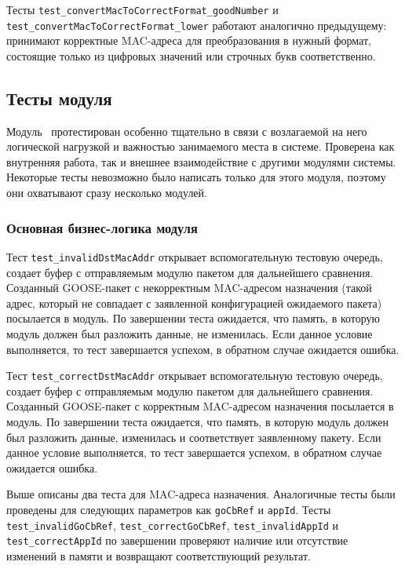 Тесты \lstinline{test_convertMacToCorrectFormat_goodNumber} и \lstinline{test_convertMacToCorrectFormat_lower} работают аналогично предыдущему: принимают корректные MAC-адреса для преобразования в нужный формат, состоящие только из  цифровых значений или  строчных букв соответственно.

\subsection{Тесты модуля \moduleRecvPackets}

Модуль \moduleRecvPackets\ протестирован особенно тщательно в связи с возлагаемой на него логической нагрузкой и важностью занимаемого места в системе. Проверена как внутренняя работа, так и внешнее взаимодействие с другими модулями системы. Некоторые тесты невозможно было написать только для этого модуля, поэтому они охватывают сразу несколько модулей.

\subsubsection{Основная бизнес-логика модуля}

Тест \lstinline{test_invalidDstMacAddr} открывает вспомогательную тестовую очередь, создает буфер с отправляемым модулю пакетом для дальнейшего сравнения.
Созданный GOOSE-пакет с некорректным  MAC-адресом назначения (такой адрес, который не совпадает с заявленной конфигурацией ожидаемого пакета) посылается в модуль. По завершении теста ожидается, что память, в которую модуль должен был разложить данные, не изменилась. Если данное условие выполняется, то тест завершается успехом, в обратном случае ожидается ошибка.

Тест \lstinline{test_correctDstMacAddr} открывает вспомогательную тестовую очередь, создает буфер с отправляемым модулю пакетом для дальнейшего сравнения.
Созданный GOOSE-пакет с корректным  MAC-адресом назначения посылается в модуль. По завершении теста ожидается, что память, в которую модуль должен был разложить данные, изменилась и соответствует заявленному пакету. Если данное условие выполняется, то тест завершается успехом, в обратном случае ожидается ошибка.

Выше описаны два теста для MAC-адреса назначения. Аналогичные тесты были проведены для следующих параметров как \lstinline{goCbRef} и \lstinline{appId}.
Тесты \lstinline{test_invalidGoCbRef}, \lstinline{test_correctGoCbRef}, \lstinline{test_invalidAppId} и \lstinline{test_correctAppId} по завершении проверяют наличие или отсутствие изменений в памяти и возвращают соответствующий результат.

